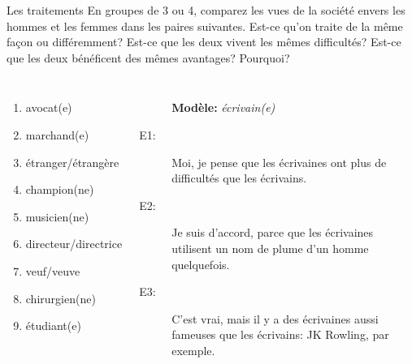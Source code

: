 \begin{frame}{Les traitements}
  \small
  En groupes de 3 ou 4, comparez les vues de la société envers les hommes et les femmes dans les paires suivantes.
  Est-ce qu'on traite de la même façon ou différemment?
  Est-ce que les deux vivent  les mêmes difficultés?
  Est-ce que les deux bénéficent des mêmes avantages?
  Pourquoi?
  \begin{columns}
    \small
      \begin{enumerate}
        \item avocat(e)
        \item marchand(e)
        \item étranger/étrangère
        \item champion(ne)
        \item musicien(ne)
        \item directeur/directrice
        \item veuf/veuve
        \item chirurgien(ne)
        \item étudiant(e)
      \end{enumerate}
      \begin{description}
        \item[] \textbf{Modèle:} \emph{écrivain(e)}
        \item[E1:] Moi, je pense que les écrivaines ont plus de difficultés que les écrivains.
        \item[E2:] Je suis d'accord, parce que les écrivaines utilisent un nom de plume d'un homme quelquefois.
        \item[E3:] C'est vrai, mais il y a des écrivaines aussi fameuses que les écrivains: JK Rowling, par exemple.
      \end{description}
  \end{columns}
\end{frame}